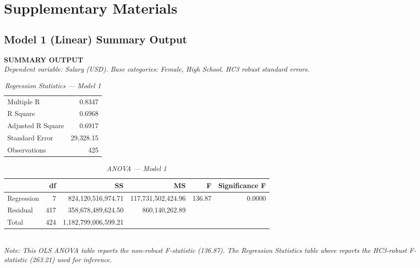 \documentclass[12pt, a4paper]{article}
\begin{document}
\section{Supplementary Materials}
\label{app:supp}

\subsection{Model 1 (Linear) Summary Output}

\noindent\textbf{SUMMARY OUTPUT}\\[0.4em]
\textit{Dependent variable: Salary (USD). Base categories: Female, High School. HC3 robust standard errors.}

\begin{table}[H]
\centering\scriptsize
\caption*{\textit{Regression Statistics — Model 1}}
\begin{tabular}{lr}
\toprule
Multiple R & 0.8347 \\
R Square & 0.6968 \\
Adjusted R Square & 0.6917 \\
Standard Error & 29{,}328.15 \\
Observations & 425 \\
\bottomrule
\end{tabular}
\end{table}

\begin{table}[H]
\centering\scriptsize
\caption*{\textit{ANOVA — Model 1}}
\begin{tabular}{lrrrrr}
\toprule
 & \textbf{df} & \textbf{SS} & \textbf{MS} & \textbf{F} & \textbf{Significance F} \\
\midrule
Regression & 7 & 824,120,516,974.71 & 117,731,502,424.96 & 136.87 & 0.0000 \\
Residual   & 417 & 358,678,489,624.50 & 860,140,262.89 & & \\
Total      & 424 & 1,182,799,006,599.21 & & & \\
\bottomrule
\end{tabular}\\
\textit{Note: This OLS ANOVA table reports the non-robust F-statistic (136.87). The Regression Statistics table above reports the HC3-robust F-statistic (263.21) used for inference.}
\end{table}
\end{document}
